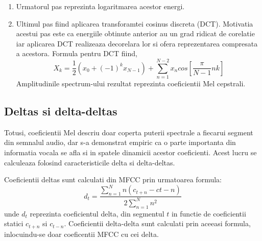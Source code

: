 \documentclass[a4paper,12pt]{book}
\begin{document}
\begin{enumerate}
\begin{equation*}
\begin{cases}
							\frac{k-f(m-1)}{f(m) - f(m-1)}&\quad f(m-1)\leq k\leq f(m) \\[5pt]
							\frac{f(m+1)-k}{f(m+1) - f(m)}&\quad f(m)\leq k\leq f(m+1) \\[3pt]
							\quad \quad 0&\quad k>f(m+1)
							\end{cases}
						\end{equation*}
						unde $m$ este numarul frecventei scalate, iar $k$ este frecventa curenta din spectrum. \newline
						Filtrele triunghiulare sunt inmultite apoi cu "power spectrum"-ul obtinut la pasul anterior si se obtin astfel energiile din fiecare filtru Mel.
						\item Urmatorul pas reprezinta logaritmarea acestor energi.
						\item Ultimul pas fiind aplicarea transforamtei cosinus discreta (DCT). Motivatia acestui pas este ca energiile obtinute anterior au un grad ridicat de corelatie iar aplicarea DCT realizeaza decorelara lor si ofera reprezentarea compresata a acestora.
						Formula pentru DCT fiind,
						\begin{equation*}
							X_k = \frac{1}{2}(x_0 + (-1)^k x_{N-1}) + \sum_{n=1}^{N-2} x_n cos[\frac{\pi}{N-1}nk]
						\end{equation*}
						Amplitudinile spectrum-ului rezultat reprezinta coeficientii Mel cepstrali.
				\end{enumerate} \par
				\subsection{Deltas si delta-deltas}
					Totusi, coeficientii Mel descriu doar coperta puterii spectrale a fiecarui segment din semnalul audio, dar s-a demonstrat empiric ca o parte importanta din informatia vocala se afla si in spatele dinamicii acestor coeficienti. Acest lucru se calculeaza folosind caracteristicile delta si delta-deltas. \par
					Coeficientii deltas sunt calculati din MFCC prin urmatoarea formula:
					\begin{equation*}
						d_t = \frac{\sum_{n=1}^{N} n(c_{t+n}-c{t-n})}{2\sum_{n=1}^{N}n^2}
					\end{equation*}
					unde $d_t$ reprezinta coeficientul delta, din segmentul $t$  in functie de coeficientii statici $c_{t+n}$ si $c_{t-n}$. 
					Coeficientii delta-delta sunt calculati prin aceeasi formula, inlocuindu-se doar coeficentii MFCC cu cei delta. \par
				
\end{document}
